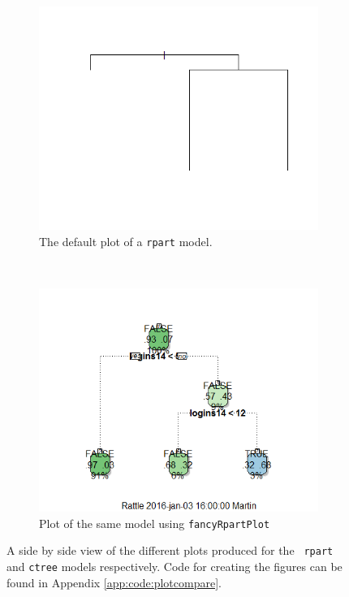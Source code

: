 \begin{figure}
  \begin{subfigure}[b]{0.45\textwidth}
    \includegraphics[width=\textwidth]{img/plot_compare_rpart_0}
    \caption{The default plot of a \texttt{rpart} model.}
    \label{fig:plotcompare2}
  \end{subfigure}
  ~
  \begin{subfigure}[b]{0.45\textwidth}
    \includegraphics[width=\textwidth]{img/plot_compare_rpart_1}
    \caption{Plot of the same model using \texttt{fancyRpartPlot}}
    \label{fig:plotcompare3}
  \end{subfigure}

  \caption{A side by side view of the different plots produced for the \texttt{
    rpart} and \texttt{ctree} models respectively. Code for creating the figures
    can be found in Appendix \ref{app:code:plotcompare}.}
  \label{fig:plotcompare}
\end{figure}


